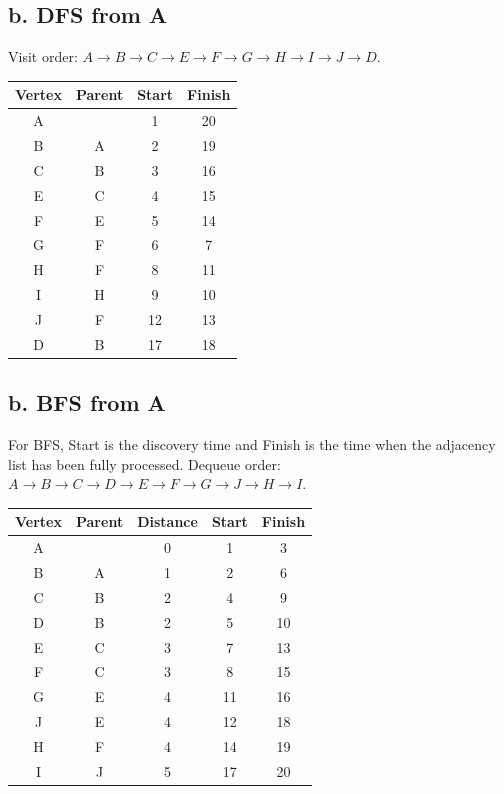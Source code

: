 \documentclass[11pt]{article}
\begin{document}
\subsection*{b. DFS from A}
Visit order: \(A \rightarrow B \rightarrow C \rightarrow E \rightarrow F \rightarrow G \rightarrow H \rightarrow I \rightarrow J \rightarrow D\).
\begin{tabular}{|c|c|c|c|}
\hline
Vertex & Parent & Start & Finish \\
\hline
A &  & 1 & 20 \\
B & A & 2 & 19 \\
C & B & 3 & 16 \\
E & C & 4 & 15 \\
F & E & 5 & 14 \\
G & F & 6 & 7 \\
H & F & 8 & 11 \\
I & H & 9 & 10 \\
J & F & 12 & 13 \\
D & B & 17 & 18 \\
\hline
\end{tabular}
\subsection*{b. BFS from A}
For BFS, Start is the discovery time and Finish is the time when the adjacency list has been fully processed.
Dequeue order: \(A \rightarrow B \rightarrow C \rightarrow D \rightarrow E \rightarrow F \rightarrow G \rightarrow J \rightarrow H \rightarrow I\).
\begin{tabular}{|c|c|c|c|c|}
\hline
Vertex & Parent & Distance & Start & Finish \\
\hline
A &  & 0 & 1 & 3 \\
B & A & 1 & 2 & 6 \\
C & B & 2 & 4 & 9 \\
D & B & 2 & 5 & 10 \\
E & C & 3 & 7 & 13 \\
F & C & 3 & 8 & 15 \\
G & E & 4 & 11 & 16 \\
J & E & 4 & 12 & 18 \\
H & F & 4 & 14 & 19 \\
I & J & 5 & 17 & 20 \\
\hline
\end{tabular}
\end{document}

